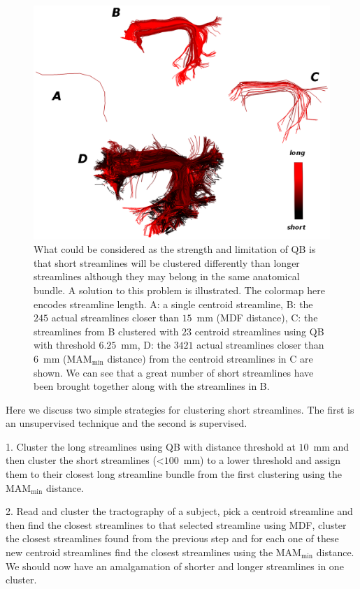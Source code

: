 \documentclass{bioinfo}
\begin{document}
\begin{figure}
  \centerline{\hspace{-1.5mm}\includegraphics[scale=0.65]{Figures/Fig_10_arcuate_small_fibers}}
  \caption{What could be considered as the strength and limitation of QB
    is that short streamlines will be clustered differently than longer
    streamlines although they may belong in the same anatomical
    bundle. A solution to this problem is illustrated. The colormap here
    encodes streamline length. A: a single centroid streamline, B: the
    $245$ actual streamlines closer than $15$~mm (MDF distance), C: the
    streamlines from B clustered with $23$ centroid streamlines using QB
    with threshold $6.25$~mm, D: the $\num{3421}$ actual streamlines
    closer than $6$~mm ($\textrm{MAM}_{\textrm{min}}$ distance) from the
    centroid streamlines in C are shown. We can see that a great number
    of short streamlines have been brought together along with the
    streamlines in B. \label{Flo:arcuate_close}}
\end{figure}

Here we discuss two simple strategies for clustering short
streamlines. The first is an unsupervised technique and the second is
supervised.

1. Cluster the long streamlines using QB with distance threshold at
$10$~mm and then cluster the short streamlines (<$100$~mm) to a lower
threshold and assign them to their closest long streamline bundle from
the first clustering using the $\mathrm{MAM}_{\mathrm{min}}$ distance.

2. Read and cluster the tractography of a subject, pick a centroid
streamline and then find the closest streamlines to that selected
streamline using MDF, cluster the closest streamlines found from the
previous step and for each one of these new centroid streamlines find
the closest streamlines using the $\textrm{MAM}_{\textrm{min}}$
distance. We should now have an amalgamation of shorter and longer
streamlines in one cluster.
\end{document}
